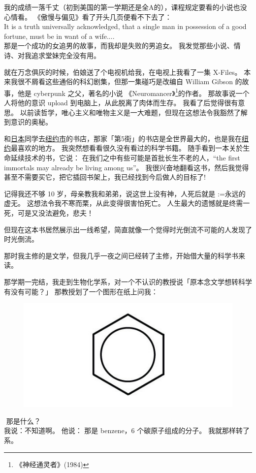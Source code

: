 \documentclass[12pt]{report}
\makeatletter
\newcommand{\tab}{\hspace*{1cm}}
\renewcommand{\d}[1]{$\underaccent{\scalebox{0.5}{\textbullet}}{\textrm{#1}}$}
\newcommand{\ds}[1]{%
  \@tfor\next:=#1\do{\d{\next}}}
\newcommand*\dashh{\textemdash\,\,}
\makeatother
\begin{document}
我的成绩一落千丈（初到美国的第一学期还是全A的），课程规定要看的小说也没心情看。 《傲慢与偏见》看了开头几页便看不下去了： \\
It is a truth universally acknowledged, that a single man in possession of a good fortune, must be in want of a wife.... \\
那是一个成功的女追男的故事，而我却是失败的男追女。 我发觉那些小说、情诗、对我追求堂妹完全没有用。

就在万念俱灰的时候，伯娘送了个电视机给我，在电视上我看了一集 X-Files。 本来我很不屑看这些通俗的科幻剧集，但那一集碰巧是改编自 William Gibson 的故事，他是 cyberpunk 之父，著名的小说 《Neuromancer》\footnote{《神经通灵者》(1984)}的作者。 那故事说一个人将他的意识 upload 到电脑上，从此脱离了肉体而生存。 我看了后觉得很有意思。 以前读哲学，唯心主义和唯物主义是一大难题，但现在这想法令我豁然了解到意识的奥秘。 

和\underline{日本}同学去\underline{纽约市}的书店，那家「第5街」的书店是全世界最大的，也是我在\underline{纽约}最喜欢的地方。 我突然想看看很久没有看过的科学书籍。 随手看到一本关於生命延续技术的书，它说： 在我们之中有些可能是首批长生不老的人，``the first immortals may already be living among us''。 我很兴奋地翻看这书，然后我觉得甚至不需要买它，把它插回书架上，我已经找到今后做人的目标了!

记得我还不够 10 岁，母亲教我和弟弟，说这世上没有神，人死后就是\ds{永远的虚无}。 这想法令我不寒而栗，从此变得很害怕死亡。 人生最大的遗憾就是终需一死，可是又没法避免，悲夫！

但现在这本书居然展示出一线希望，简直就像一个觉得时光倒流不可能的人发现了时光倒流。

那时我主修的是文学，但我几乎一夜之间已经转了主修，开始借大量的科学书来读。

那学期一完结，我走到生物化学系，对一个不认识的教授说「原本念文学想转科学有没有可能？」 那教授划了一个图形在纸上问我：
\begin{figure}[H]
\centering
\includegraphics[scale=0.4]{benzene.jpg}
\end{figure}
\vspace{-1cm}
\tab \dashh 那是什么？\\
我说：不知道啊。 他说： 那是 benzene，6 个碳原子组成的分子。  我就那样转了系。
\end{document}
